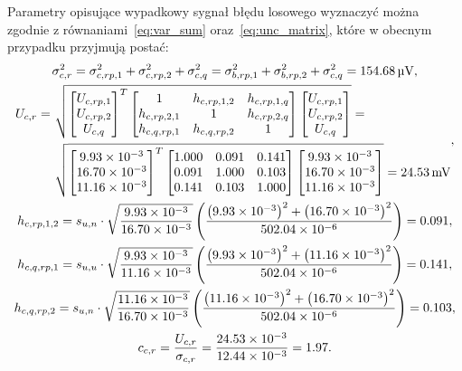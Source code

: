 Parametry opisujące wypadkowy sygnał błędu losowego wyznaczyć można zgodnie z równaniami~\eqref{eq:var_sum} oraz~\eqref{eq:unc_matrix}, które w obecnym przypadku przyjmują postać:
\begin{gather}
\sigma_{c,r}^{2} = \sigma_{c,rp,1}^{2} + \sigma_{c,rp,2}^{2} + \sigma_{c,q}^{2} = \sigma_{b,rp,1}^{2} + \sigma_{b,rp,2}^{2} + \sigma_{c,q}^{2} = \qty{154.68}{\micro V} \label{eq:sym_partc_rand_var}, \\
\begin{split}
U_{c,r} = ~ & \sqrt{
\begin{bmatrix}
U_{c,rp,1} \\ U_{c,rp,2} \\ U_{c,q}
\end{bmatrix}^{T}
\begin{bmatrix}
1            & h_{c,rp,1,2} & h_{c,rp,1,q} \\
h_{c,rp,2,1} & 1            & h_{c,rp,2,q} \\
h_{c,q,rp,1} & h_{c,q,rp,2} & 1
\end{bmatrix}
\begin{bmatrix}
U_{c,rp,1} \\ U_{c,rp,2} \\ U_{c,q}
\end{bmatrix}} = ~ \\ & \sqrt{
\begin{bmatrix}
\num{9.93e-3} \\ \num{16.70e-3} \\ \num{11.16e-3}
\end{bmatrix}^{T}
\begin{bmatrix}
1.000 & 0.091 & 0.141 \\
0.091 & 1.000 & 0.103 \\
0.141 & 0.103 & 1.000
\end{bmatrix}
\begin{bmatrix}
\num{9.93e-3} \\ \num{16.70e-3} \\ \num{11.16e-3}
\end{bmatrix}} = \qty{24.53}{mV}
\end{split}
\label{eq:sym_partc_rand_uncert}, \\
h_{c,rp,1,2} = s_{u,n} \cdot \sqrt{\frac{\num{9.93e-3}}{\num{16.70e-3}}} \left( \frac{\left(\num{9.93e-3}\right)^{2} + \left(\num{16.70e-3}\right)^{2}}{\num{502.04e-6}} \right) = 0.091 \label{eq:sym_partc_coher_rp_1_2}, \\
h_{c,q,rp,1} = s_{u,u} \cdot \sqrt{\frac{\num{9.93e-3}}{\num{11.16e-3}}} \left( \frac{\left(\num{9.93e-3}\right)^{2} + \left(\num{11.16e-3}\right)^{2}}{\num{502.04e-6}} \right) = 0.141 \label{eq:sym_partc_coher_q_rp_1}, \\
h_{c,q,rp,2} = s_{u,n} \cdot \sqrt{\frac{\num{11.16e-3}}{\num{16.70e-3}}} \left( \frac{\left(\num{11.16e-3}\right)^{2} + \left(\num{16.70e-3}\right)^{2}}{\num{502.04e-6}} \right) = 0.103 \label{eq:sym_partc_coher_q_rp_2}, \\
c_{c,r} = \frac{U_{c,r}}{\sigma_{c,r}} = \frac{\num{24.53e-3}}{\num{12.44e-3}} = 1.97 \label{eq:sym_partc_rand_factor}.
\end{gather}

